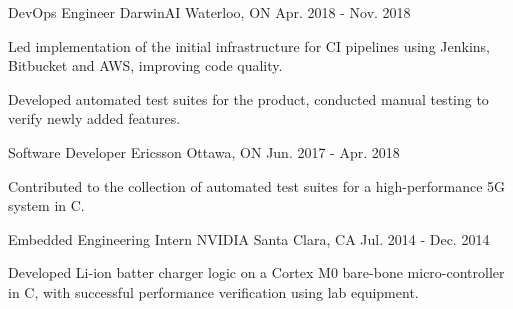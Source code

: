 \begin{cventries}
  \cventry
    {DevOps Engineer} %
    {DarwinAI} %
    {Waterloo, ON} %
    {Apr. 2018 - Nov. 2018} %
    {
      \begin{cvitems} %
        \item {Led implementation of the initial infrastructure for CI pipelines using Jenkins, Bitbucket and AWS, improving code quality.}
        \item {Developed automated test suites for the product, conducted manual testing to verify newly added features.}
      \end{cvitems}
    }

  \cventry
    {Software Developer} %
    {Ericsson} %
    {Ottawa, ON} %
    {Jun. 2017 - Apr. 2018} %
    {
      \begin{cvitems} %
        \item {Contributed to the collection of automated test suites for a high-performance 5G system in C.}
      \end{cvitems}
    }

  \cventry
    {Embedded Engineering Intern} %
    {NVIDIA} %
    {Santa Clara, CA} %
    {Jul. 2014 - Dec. 2014} %
    {
      \begin{cvitems} %
        \item {Developed Li-ion batter charger logic on a Cortex M0 bare-bone micro-controller in C, with successful performance verification using lab equipment.}
      \end{cvitems}
    }

\end{cventries}
